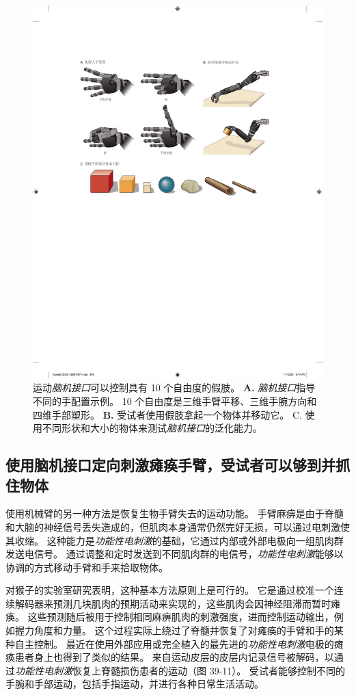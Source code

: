 \begin{figure}[htbp]
	\centering
	\includegraphics[width=0.8\linewidth]{chap39/fig_39_10}
	\caption{运动\textit{脑机接口}可以控制具有 10 个自由度的假肢。 
		\textbf{A.} \textit{脑机接口}指导不同的手配置示例。
		10 个自由度是三维手臂平移、三维手腕方向和四维手部塑形。
		\textbf{B.} 受试者使用假肢拿起一个物体并移动它。
		C. 使用不同形状和大小的物体来测试\textit{脑机接口}的泛化能力\cite{wodlinger2014ten}。}
	\label{fig:39_10}
\end{figure}



\subsection{使用脑机接口定向刺激瘫痪手臂，受试者可以够到并抓住物体}

使用机械臂的另一种方法是恢复生物手臂失去的运动功能。
手臂麻痹是由于脊髓和大脑的神经信号丢失造成的，但肌肉本身通常仍然完好无损，可以通过电刺激使其收缩。
这种能力是\textit{功能性电刺激}的基础，它通过内部或外部电极向一组肌肉群发送电信号。
通过调整和定时发送到不同肌肉群的电信号，\textit{功能性电刺激}能够以协调的方式移动手臂和手来拾取物体。


对猴子的实验室研究表明，这种基本方法原则上是可行的。
它是通过校准一个连续解码器来预测几块肌肉的预期活动来实现的，这些肌肉会因神经阻滞而暂时瘫痪。
这些预测随后被用于控制相同麻痹肌肉的刺激强度，进而控制运动输出，例如握力角度和力量。
这个过程实际上绕过了脊髓并恢复了对瘫痪的手臂和手的某种自主控制。
最近在使用外部应用或完全植入的最先进的\textit{功能性电刺激}电极的瘫痪患者身上也得到了类似的结果。
来自运动皮层的皮层内记录信号被解码，以通过\textit{功能性电刺激}恢复上脊髓损伤患者的运动（图 39-11）。
受试者能够控制不同的手腕和手部运动，包括手指运动，并进行各种日常生活活动。


